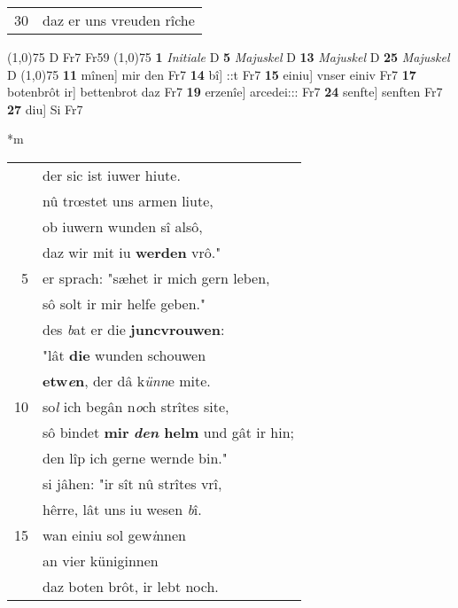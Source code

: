 \documentclass[8pt,a4paper,notitlepage]{article}
\begin{document}
\begin{table}[ht]
\begin{minipage}[t]{0.5\linewidth}
\begin{tabular}{rl}
30 & daz er uns vreuden rîche\\ 
\end{tabular}
\scriptsize
\line(1,0){75} \newline
D Fr7 Fr59 \newline
\line(1,0){75} \newline
\textbf{1} \textit{Initiale} D  \textbf{5} \textit{Majuskel} D  \textbf{13} \textit{Majuskel} D  \textbf{25} \textit{Majuskel} D  \newline
\line(1,0){75} \newline
\textbf{11} mînen] mir den Fr7 \textbf{14} bî] ::t Fr7 \textbf{15} einiu] vnser einiv Fr7 \textbf{17} botenbrôt ir] bettenbrot daz Fr7 \textbf{19} erzenîe] arcedei::: Fr7 \textbf{24} senfte] senften Fr7 \textbf{27} diu] Si Fr7 \newline
\end{minipage}
\hspace{0.5cm}
\begin{minipage}[t]{0.5\linewidth}
\small
\begin{center}*m
\end{center}
\begin{tabular}{rl}
 & der sic ist iuwer hiute.\\ 
 & nû trœstet uns armen liute,\\ 
 & ob iuwern wunden sî alsô,\\ 
 & daz wir mit iu \textbf{werden} vrô."\\ 
5 & er sprach: "sæhet ir mich gern leben,\\ 
 & sô solt ir mir helfe geben."\\ 
 & des \textit{b}at er die \textbf{juncvrouwen}:\\ 
 & "lât \textbf{die} wunden schouwen\\ 
 & \textbf{etw\textit{e}n}, der dâ k\textit{ünn}e mite.\\ 
10 & so\textit{l} ich begân n\textit{o}ch strîtes site,\\ 
 & sô bindet \textbf{mir} \textbf{\textit{den} helm} und gât ir hin;\\ 
 & den lîp ich gerne wernde bin."\\ 
 & si jâhen: "ir sît nû strîtes vrî,\\ 
 & hêrre, lât uns iu wesen \textit{b}î.\\ 
15 & wan einiu sol gew\textit{i}nnen\\ 
 & an vier küniginnen\\ 
 & daz boten brôt, ir lebt noch.\\ 

\end{tabular}
\end{minipage}
\end{table}
\end{document}
